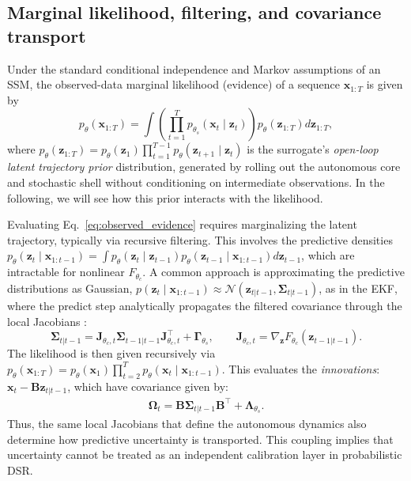 \documentclass{article}
\theoremstyle{plain}
\theoremstyle{definition}
\theoremstyle{remark}
\begin{document}
\subsection{Marginal likelihood, filtering, and covariance transport}
\label{subsec:evidence_filtering}
Under the standard conditional independence and Markov assumptions of an SSM, the observed-data marginal likelihood (evidence) of a sequence $\bm{x}_{1:T}$ is given by 
\begin{equation}
\label{eq:observed_evidence}
p_\theta(\bm x_{1:T}) = \int\left(\prod_{t=1}^T p_{\theta_s}(\bm x_t\mid \bm z_t)\right) p_\theta(\bm z_{1:T}) d\bm z_{1:T},
\end{equation}
where $p_\theta(\bm z_{1:T}) = p_\theta(\bm z_1)\prod_{t=1}^{T-1}p_\theta(\bm z_{t+1}\mid \bm z_t)$ is the surrogate's \emph{open-loop latent trajectory prior} distribution, generated by rolling out the autonomous core and stochastic shell without conditioning on intermediate observations. In the following, we will see how this prior interacts with the likelihood.

Evaluating Eq.~\ref{eq:observed_evidence} requires marginalizing the latent trajectory, typically via recursive filtering. This involves the predictive densities $p_\theta(\bm z_t \mid \bm x_{1:t-1}) = \int p_\theta(\bm z_t \mid \bm z_{t-1}) p_\theta(\bm z_{t-1} \mid \bm x_{1:t-1}) d\bm z_{t-1}$, which are intractable for nonlinear $F_{\theta_c}$. A common approach is approximating the predictive distributions as Gaussian, $p(\bm z_t \mid \bm x_{1:t-1}) \approx \mathcal{N}(\bm z_{t|t-1}, \bm\Sigma_{t|t-1})$, as in the EKF, where the predict step analytically propagates the filtered covariance through the local Jacobians \citep{sarkka2023bayesian}:
\begin{equation}
\label{eq:ekf_predict_cov}
\bm\Sigma_{t|t-1} = \bm J_{\theta_c,t}\bm\Sigma_{t-1|t-1}\bm J_{\theta_c,t}^\top + \bm\Gamma_{\theta_s},\qquad \bm J_{\theta_c,t} = \nabla_{\bm z}F_{\theta_c}(\bm z_{t-1|t-1}).
\end{equation}
The likelihood is then given recursively via $p_\theta(\bm x_{1:T}) = p_\theta(\bm x_1) \prod_{t=2}^T p_\theta(\bm x_t \mid \bm x_{1:t-1})$. This evaluates the \emph{innovations}:
$\bm x_t -\bm{Bz}_{t|t-1}$, which have covariance given by: 
\begin{align}
\label{eq:innovation}
\bm\Omega_t = \bm B\bm\Sigma_{t|t-1}\bm B^\top + \bm\Lambda_{\theta_s}.
\end{align} 
Thus, the same local Jacobians that define the autonomous dynamics also determine
how predictive uncertainty is transported. This coupling implies that uncertainty cannot be treated as an independent calibration layer in probabilistic DSR. 
\end{document}
